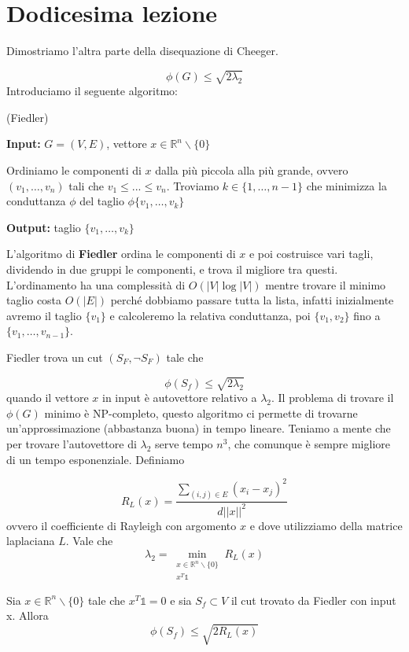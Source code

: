 \documentclass[12pt]{report}
\begin{document}
\chapter{Dodicesima lezione}

\noindent 
Dimostriamo l'altra parte della disequazione di Cheeger.

$$\phi(G) \leq \sqrt{2 \lambda_2}$$
Introduciamo il seguente algoritmo:

\begin{algorithm}
\caption{(Fiedler)}\label{euclid}
 \textbf{Input:} $G = (V,E)$, vettore $x \in \mathbb{R}^n \backslash \{0\} $
\begin{algorithmic}[1]
\State Ordiniamo le componenti di $x$ dalla più piccola alla più grande, ovvero $(v_1,\dots,v_n)$ tali che $v_1 \leq ... \leq v_n$.
\State Troviamo $k \in \{1,\dots,n-1\} $ che minimizza la conduttanza $\phi$ del taglio $\phi\{v_1,\dots,v_k\}$
\end{algorithmic}
\textbf{Output:} taglio $\{v_1,\dots,v_k\}$
\end{algorithm}

\noindent 
L'algoritmo di \textbf{Fiedler} ordina le componenti di $x$ e poi costruisce vari tagli, dividendo in due gruppi le componenti, e trova il migliore tra questi. L'ordinamento ha una complessità di $O(|V| \log |V|)$ mentre trovare il minimo taglio costa $O(|E|)$ perché dobbiamo passare tutta la lista, infatti inizialmente avremo il taglio $\{v_1\}$ e calcoleremo la relativa conduttanza, poi $\{v_1,v_2\}$ fino a $\{v_1,\dots,v_{n-1}\}$. 

\noindent
Fiedler trova un cut $(S_F,\neg S_F)$ tale che 

$$\phi(S_f) \leq \sqrt{2 \lambda_2}$$
quando il vettore $x$ in input è autovettore relativo a $\lambda_2$. Il problema di trovare il $\phi(G)$ minimo è NP-completo, questo algoritmo ci permette di trovarne un'approssimazione (abbastanza buona) in tempo lineare. Teniamo a mente che per trovare l'autovettore di $\lambda_2$ serve tempo $n^3$, che comunque è sempre migliore di un tempo esponenziale. Definiamo

$$R_L(x) = \frac{\sum_{(i,j) \in E} (x_i - x_j)^2}{d||x||^2}$$
ovvero il coefficiente di Rayleigh con argomento $x$ e dove utilizziamo della matrice laplaciana $L$. Vale che 
$$\lambda_2 = \min_{\substack{x \in \mathbb{R}^n\backslash\{0\} \\ x^T \mathds{1}}} R_L(x)$$


\begin{teo}
    Sia $x \in \mathbb{R}^n \backslash\{0\}$ tale che $x^T \mathds{1} = 0$ e sia $S_f \subset V$ il cut trovato da Fiedler con input x. Allora 
    $$\phi(S_f) \leq \sqrt{2 R_L(x)}$$
\end{teo}
\end{document}
